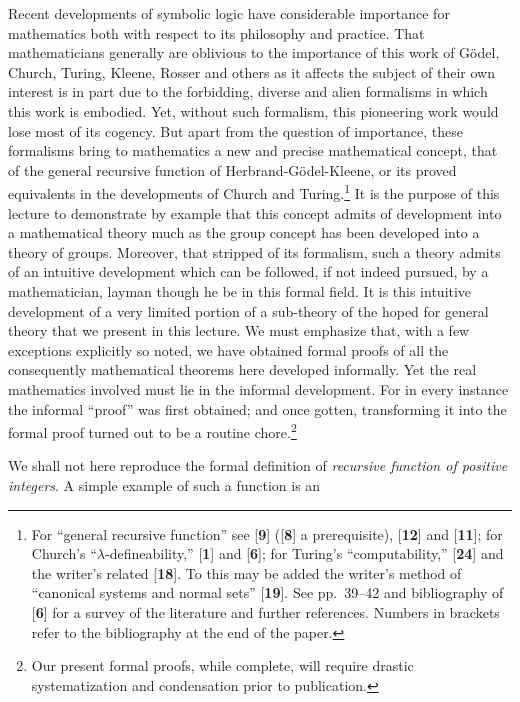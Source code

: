 \documentclass[11pt]{article}
\begin{document}
\setcounter{page}{284}
 Recent developments of symbolic logic have considerable importance for mathematics both with respect to its philosophy and practice. That mathematicians generally are oblivious to the importance of this work of G\"odel, Church, Turing, Kleene, Rosser and others as it affects the subject of their own interest is in part due to the forbidding, diverse and alien formalisms in which this work is embodied. Yet, without such formalism, this pioneering work would lose most of its cogency. But apart from the question of importance, these formalisms bring to mathematics a new and precise mathematical concept, that of the general recursive function of Herbrand-G\"odel-Kleene, or its proved equivalents in the developments of Church and Turing.\footnote{For ``general recursive function'' see [\textbf{9}] ([\textbf{8}] a prerequisite), [\textbf{12}] and [\textbf{11}]; for Church's ``$\lambda$-defineability,'' [\textbf{1}] and [\textbf{6}]; for Turing's ``computability,'' [\textbf{24}] and the writer's related [\textbf{18}]. To this may be added the writer's method of ``canonical systems and normal sets'' [\textbf{19}]. See pp.~39--42 and bibliography of [\textbf{6}] for a survey of the literature and further references. Numbers in brackets refer to the bibliography at the end of the paper.} It is the purpose of this lecture to demonstrate by example that this concept admits of development into a mathematical theory much as the group concept has been developed into a theory of groups. Moreover, that stripped of its formalism, such a theory admits of an intuitive development which can be followed, if not indeed pursued, by a mathematician, layman though he be in this formal field. It is this intuitive development of a very limited portion of a sub-theory of the hoped for general theory that we present in this lecture. We must emphasize that, with a few exceptions explicitly so noted, we have obtained formal proofs of all the consequently mathematical theorems here developed informally. Yet the real mathematics involved must lie in the informal development. For in every instance the informal ``proof'' was first obtained; and once gotten, transforming it into the formal proof turned out to be a routine chore.\footnote{Our present formal proofs, while complete, will require drastic systematization and condensation prior to publication.}

We shall not here reproduce the formal definition of \emph{recursive function of positive integers}. A simple example of such a function is an
\end{document}
